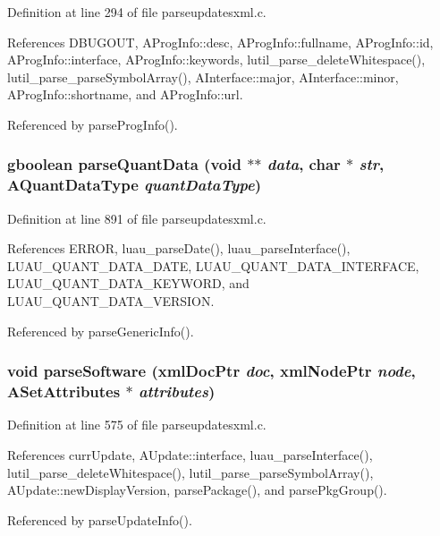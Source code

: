 Definition at line 294 of file parseupdatesxml.c.

References DBUGOUT, AProg\-Info::desc, AProg\-Info::fullname, AProg\-Info::id, AProg\-Info::interface, AProg\-Info::keywords, lutil\_\-parse\_\-delete\-Whitespace(), lutil\_\-parse\_\-parse\-Symbol\-Array(), AInterface::major, AInterface::minor, AProg\-Info::shortname, and AProg\-Info::url.

Referenced by parse\-Prog\-Info().
\subsubsection{\setlength{\rightskip}{0pt plus 5cm}gboolean parse\-Quant\-Data (void $\ast$$\ast$ {\em data}, char $\ast$ {\em str}, {\bf AQuant\-Data\-Type} {\em quant\-Data\-Type})\hspace{0.3cm}{\tt  [static]}}\label{parseupdatesxml_8c_a20}




Definition at line 891 of file parseupdatesxml.c.

References ERROR, luau\_\-parse\-Date(), luau\_\-parse\-Interface(), LUAU\_\-QUANT\_\-DATA\_\-DATE, LUAU\_\-QUANT\_\-DATA\_\-INTERFACE, LUAU\_\-QUANT\_\-DATA\_\-KEYWORD, and LUAU\_\-QUANT\_\-DATA\_\-VERSION.

Referenced by parse\-Generic\-Info().
\subsubsection{\setlength{\rightskip}{0pt plus 5cm}void parse\-Software (xml\-Doc\-Ptr {\em doc}, xml\-Node\-Ptr {\em node}, {\bf ASet\-Attributes} $\ast$ {\em attributes})\hspace{0.3cm}{\tt  [static]}}\label{parseupdatesxml_8c_a10}




Definition at line 575 of file parseupdatesxml.c.

References curr\-Update, AUpdate::interface, luau\_\-parse\-Interface(), lutil\_\-parse\_\-delete\-Whitespace(), lutil\_\-parse\_\-parse\-Symbol\-Array(), AUpdate::new\-Display\-Version, parse\-Package(), and parse\-Pkg\-Group().

Referenced by parse\-Update\-Info().
